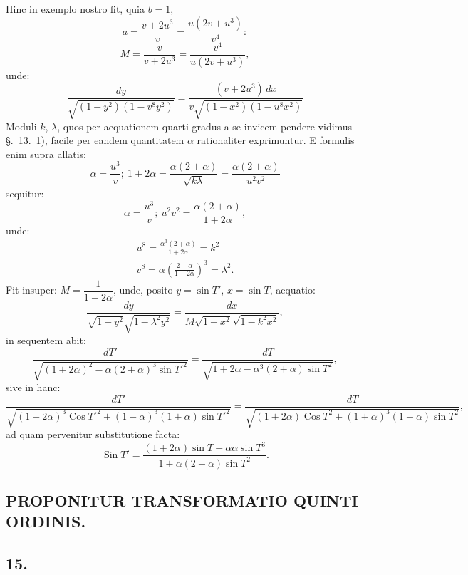 \documentclass{article}
\begin{document}
Hinc in exemplo nostro fit, quia $b=1$,
\[
a=\frac{v+2u^{3}}{v}=\frac{u(2v+u^{3})}{v^{4}}:
\]
\[
M=\frac{v}{v+2u^{3}}=\frac{v^{4}}{u(2v+u^{3})},
\]
unde:
\[
\frac{dy}{\sqrt{(1-y^{2})(1-v^{8}y^{2})}}=\frac{(v+2u^{3})\,dx}{v\sqrt{(1-x^{2})(1-u^{8}x^{2})}}
\]
Moduli $k$, $\lambda$, quos per aequationem quarti gradus a se invicem pendere vidimus §.\ 13.\ 1), facile per eandem quantitatem $\alpha$ rationaliter exprimuntur. E formulis enim supra allatis:
\[
\alpha=\frac{u^{3}}{v};\ 1+2\alpha=\frac{\alpha(2+\alpha)}{\sqrt{k\lambda}}=\frac{\alpha(2+\alpha)}{u^{2}v^{2}}
\]
sequitur:
\[
\alpha=\frac{u^{3}}{v};\ u^{2}v^{2}=\frac{\alpha(2+\alpha)}{1+2\alpha},
\]
unde:
\[
\begin{gathered}
u^{8}=\frac{\alpha^{3}(2+\alpha)}{1+2\alpha}=k^{2}\\
v^{8}=\alpha\left(\frac{2+\alpha}{1+2\alpha}\right)^{3}=\lambda^{2}.
\end{gathered}
\]
Fit insuper: $M=\dfrac{1}{1+2\alpha}$, unde, posito $y=\sin T'$, $x=\sin T$, aequatio:
\[
\frac{dy}{\sqrt{1-y^{2}}\sqrt{1-\lambda^{2}y^{2}}}=\frac{dx}{M\sqrt{1-x^{2}}\sqrt{1-k^{2}x^{2}}},
\]
in sequentem abit:
\[
\frac{dT'}{\sqrt{(1+2\alpha)^{2}-\alpha(2+\alpha)^{3}\sin T'^{2}}}=\frac{dT}{\sqrt{1+2\alpha-\alpha^{3}(2+\alpha)\sin T^{2}}},
\]
sive in hanc:
\[
\frac{dT'}{\sqrt{(1+2\alpha)^{3}\operatorname{Cos}T'^{2}+(1-\alpha)^{3}(1+\alpha)\sin T'^{2}}}=\frac{dT}{\sqrt{(1+2\alpha)\operatorname{Cos}T^{2}+(1+\alpha)^{3}(1-\alpha)\sin T^{2}}},
\]
ad quam pervenitur substitutione facta:
\[
\operatorname{Sin}T'=\frac{(1+2\alpha)\sin T+\alpha\alpha\sin T^{3}}{1+\alpha(2+\alpha)\sin T^{2}}.
\]


\subsection*{PROPONITUR TRANSFORMATIO QUINTI ORDINIS.}

\subsection*{15.}
\end{document}
